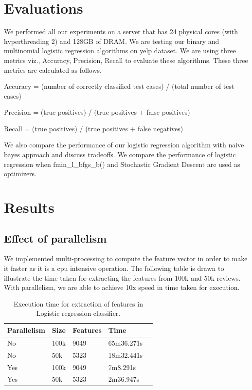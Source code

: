 \documentclass{article}
\begin{document}
\section{Evaluations}

We performed all our experiments on a server that has 24 physical cores (with hyperthreading 2) and 128GB of DRAM. We are testing our binary and multinomial logistic regression algorithms on yelp dataset. We are using three metrics viz., Accuracy, Precision, Recall to evaluate these algorithms. These three metrics are calculated as follows.


Accuracy = (number of correctly classified test cases) / (total number of test cases) 


Precision = (true positives) / (true positives + false positives)


Recall =  (true positives) / (true positives + false negatives)


We also compare the performance of our logistic regression algorithm with naive bayes approach and discuss tradeoffs. We compare the performance of logistic regression when fmin\_l\_bfgs\_b() and Stochastic Gradient Descent are used as optimizers.

\section{Results}


\subsection{Effect of parallelism}
We implemented multi-processing to compute the feature vector in order to make it faster as it is a cpu intensive operation. The following table is drawn to illustrate the time taken for extracting the features from 100k and 50k reviews. With parallelism, we are able to achieve 10x speed in time taken for execution.


\begin{table}[H]
\caption{Execution time for extraction of features in Logistic regression classifier.}
\label{sample-table}
\begin{center}
\begin{small}
\begin{sc}
\begin{tabular}{lllll}
\hline
Parallelism & Size & Features & Time \\
\hline
No  & 100k & 9049 & 65m36.271s \\
No  & 50k & 5323 & 18m32.441s \\
Yes  & 100k & 9049 & 7m8.291s \\
Yes  & 50k & 5323 & 2m36.947s \\
\hline
\end{tabular}
\end{sc}
\end{small}
\end{center}
\end{table}
\end{document}
